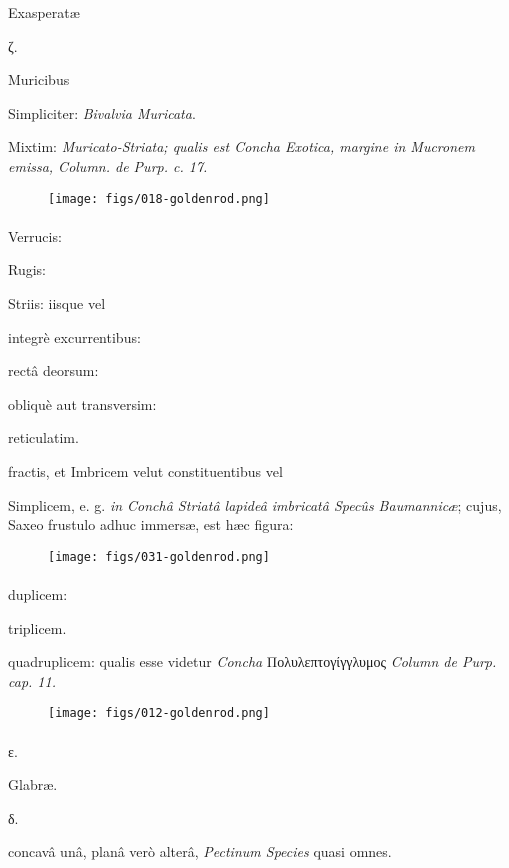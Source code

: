 \documentclass[a4paper, 11pt, oneside, polutonikogreek, german]{article}
\begin{document}
Exasperatæ

ζ.

Muricibus

Simpliciter: \emph{Bivalvia Muricata}.

Mixtim: \emph{Muricato-Striata; qualis est Concha Exotica, margine in Mucronem emissa, Column. de Purp. c. 17.}

\begin{figure}[H]
\centering
\texttt{[image: figs/018-goldenrod.png]}
\end{figure}
\paragraph{}
Verrucis:

Rugis:

Striis: iisque vel

integrè excurrentibus:

rectâ deorsum:

obliquè aut transversim:

reticulatim.

fractis, et Imbricem velut constituentibus vel

Simplicem, e. g. \emph{in Conchâ Striatâ lapideâ imbricatâ Specûs Baumannicæ}; cujus, Saxeo frustulo adhuc immersæ, est hæc figura:

\begin{figure}[H]
\centering
\texttt{[image: figs/031-goldenrod.png]}
\end{figure}
\paragraph{}
duplicem:

triplicem.

quadruplicem: qualis esse videtur \emph{Concha} Πολυλεπτογίγγλυμος \emph{Column de Purp. cap. 11.}

\begin{figure}[H]
\centering
\texttt{[image: figs/012-goldenrod.png]}
\end{figure}
\paragraph{}
ε.

Glabræ.

δ.

concavâ unâ, planâ verò alterâ, \emph{Pectinum Species} quasi omnes.
\end{document}
